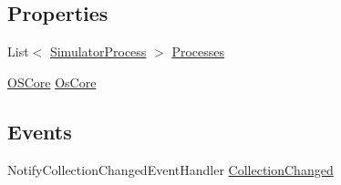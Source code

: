 \subsection*{Properties}
\begin{DoxyCompactItemize}
\item 
List$<$ \hyperlink{class_c_p_u___o_s___simulator_1_1_operating___system_1_1_simulator_process}{Simulator\+Process} $>$ \hyperlink{class_c_p_u___o_s___simulator_1_1_operating_system_main_window_aadbbb1f580d767211e180a95ec71b849}{Processes}
\item 
\hyperlink{class_c_p_u___o_s___simulator_1_1_operating___system_1_1_o_s_core}{O\+S\+Core} \hyperlink{class_c_p_u___o_s___simulator_1_1_operating_system_main_window_ad714e0ed6e880516f8afc3f1531a2d14}{Os\+Core}
\end{DoxyCompactItemize}
\subsection*{Events}
\begin{DoxyCompactItemize}
\item 
Notify\+Collection\+Changed\+Event\+Handler \hyperlink{class_c_p_u___o_s___simulator_1_1_operating_system_main_window_af8aeaf0c83021caf8f735ea7c051848c}{Collection\+Changed}
\end{DoxyCompactItemize}

